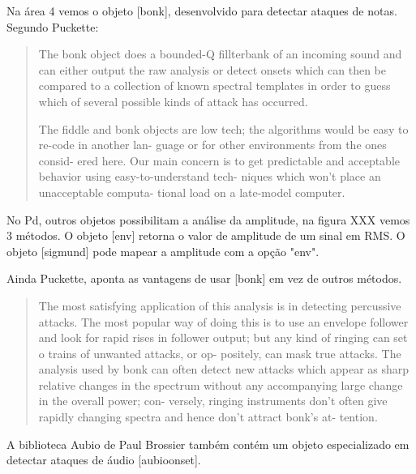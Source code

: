 \documentclass{ppgmus}
\begin{document}


Na área 4 vemos o objeto [bonk\texttildelow], desenvolvido para
detectar ataques de notas. Segundo Puckette:


\begin{quotation}
 The bonk object does a bounded-Q fillterbank of an incoming sound and
can either output the raw analysis or detect onsets
which can then be compared to a collection of known
spectral templates in order to guess which of several
possible kinds of attack has occurred.

The fiddle and bonk objects are low tech; the
algorithms would be easy to re-code in another lan-
guage or for other environments from the ones consid-
ered here. Our main concern is to get predictable and
acceptable behavior using easy-to-understand tech-
niques which won't place an unacceptable computa-
tional load on a late-model computer.
\end{quotation}

No Pd, outros objetos possibilitam a análise da amplitude,
na figura XXX vemos 3 métodos. O objeto [env\texttildelow]
retorna o valor de amplitude de um sinal em RMS. O objeto
[sigmund\texttildelow] pode mapear a amplitude com a opção
"env".


Ainda Puckette, aponta as vantagens de usar [bonk\texttildelow]
em vez de outros métodos.

\begin{quotation}
 
The most satisfying application of this analysis is in
detecting percussive attacks. The most popular way
of doing this is to use an envelope follower and look
for rapid rises in follower output; but any kind of
ringing can set o trains of unwanted attacks, or op-
positely, can mask true attacks. The analysis used by
bonk can often detect new attacks which appear as
sharp relative changes in the spectrum without any
accompanying large change in the overall power; con-
versely, ringing instruments don't often give rapidly
changing spectra and hence don't attract bonk's at-
tention.
\end{quotation}

A biblioteca Aubio de Paul Brossier também contém um objeto
especializado em detectar ataques de áudio [aubioonset\texttildelow].


\end{document}
